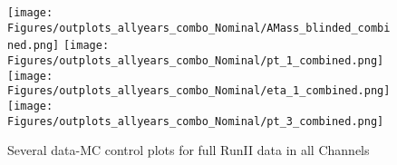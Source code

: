 \begin{figure}[ht!b]
  \centering
  \texttt{[image: Figures/outplots\_allyears\_combo\_Nominal/AMass\_blinded\_combined.png]}
  \texttt{[image: Figures/outplots\_allyears\_combo\_Nominal/pt\_1\_combined.png]}\\
  \texttt{[image: Figures/outplots\_allyears\_combo\_Nominal/eta\_1\_combined.png]}
  \texttt{[image: Figures/outplots\_allyears\_combo\_Nominal/pt\_3\_combined.png]}\\
    \caption{\label{fig:AMass_RunII}  Several data-MC control plots for full RunII data in all Channels}
\end{figure}




